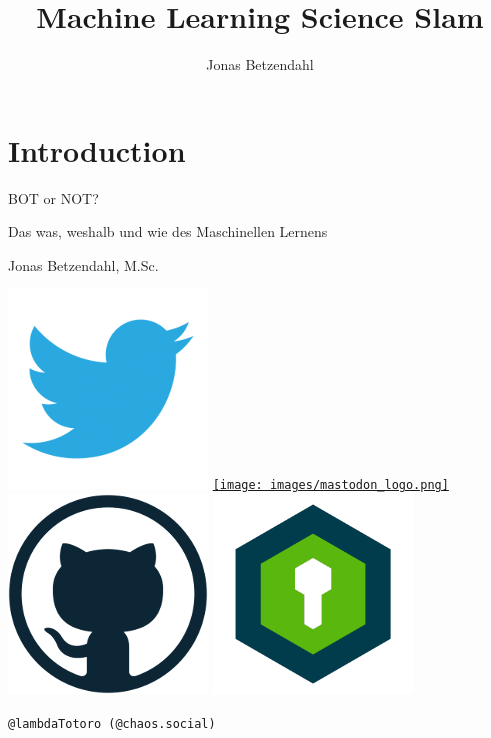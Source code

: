 \documentclass[aspectratio=43,x11names]{beamer}
\author{Jonas Betzendahl}
\title{Machine Learning Science Slam}
\begin{document}
\section{Introduction}

\begin{frame}
\begin{center}
\vfill
\huge BOT or NOT?
\normalsize 
\smallskip
\smallskip

Das was, weshalb und wie des Maschinellen Lernens 
\bigskip\bigskip

\large Jonas Betzendahl, M.Sc.
\bigskip\bigskip

\href{https://twitter.com/lambdatotoro}{\includegraphics[scale=0.125]{images/twitter_logo.png}}
\href{https://chaos.social/@lambdatotoro}{\texttt{[image: images/mastodon\_logo.png]}}
\href{https://github.com/jbetzend}{\includegraphics[scale=0.125]{images/github_logo.png}}
\href{https://whispeer.de/en/user/jbetzend}{\includegraphics[scale=0.125]{images/whispeer_logo.png}}

\texttt{@lambdaTotoro (@chaos.social)}
\end{center}
\end{frame}
\end{document}
